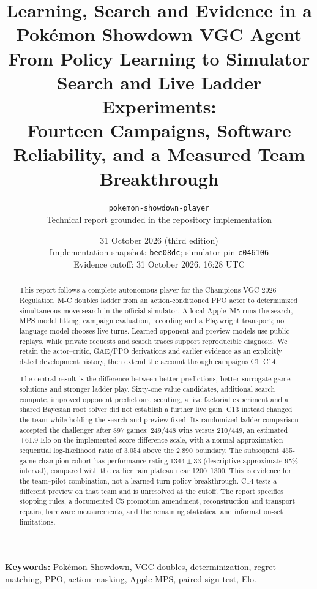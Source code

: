 \documentclass[11pt,letterpaper]{article}
\title{\textcolor{ink}{Learning, Search and Evidence in a\\
  Pok\'{e}mon Showdown VGC Agent}\\[0.6em]
  \large From Policy Learning to Simulator Search and Live Ladder Experiments:\\
  Fourteen Campaigns, Software Reliability, and a Measured Team Breakthrough}
\author{\texttt{pokemon-showdown-player}\\\small Technical report grounded in the repository implementation}
\date{31 October 2026 (third edition)\\
  \small Implementation snapshot: \texttt{bee08dc}; simulator pin \texttt{c046106}\\
  Evidence cutoff: 31 October 2026, 16:28 UTC}
\theoremstyle{remark}
\begin{document}
\maketitle
\begin{abstract}
This report follows a complete autonomous player for the Champions VGC 2026
Regulation~M-C doubles ladder from an action-conditioned PPO actor to
determinized simultaneous-move search in the official simulator. A local
Apple~M5 runs the search, MPS model fitting, campaign evaluation, recording and
a Playwright transport; no language model chooses live turns. Learned
opponent and preview models use public replays, while private requests and
search traces support reproducible diagnosis. We retain the actor--critic,
GAE/PPO derivations and earlier evidence as an explicitly dated development
history, then extend the account through campaigns C1--C14.

The central result is the difference between better predictions, better
surrogate-game solutions and stronger ladder play. Sixty-one value candidates,
additional search compute, improved opponent predictions, scouting, a live
factorial experiment and a shared Bayesian root solver did not establish a
further live gain. C13 instead changed the team while holding the search and
preview fixed. Its randomized ladder comparison accepted the challenger after
897 games: 249/448 wins versus 210/449, an estimated +61.9 Elo on the
implemented score-difference scale, with a normal-approximation sequential
log-likelihood ratio of 3.054 above the 2.890 boundary. The subsequent
455-game champion cohort has performance rating $1344\pm33$ (descriptive
approximate 95\% interval), compared with the earlier rain plateau near
1200--1300. This is evidence for the team--pilot combination, not a learned
turn-policy breakthrough. C14 tests a different preview on that team and is
unresolved at the cutoff. The report specifies stopping rules, a documented
C5 promotion amendment, reconstruction and transport repairs, hardware
measurements, and the remaining statistical and information-set limitations.
\end{abstract}

\vspace{0.5em}
\noindent\textbf{Keywords:} Pok\'{e}mon Showdown, VGC doubles, determinization,
regret matching, PPO, action masking, Apple MPS, paired sign test, Elo.

\clearpage
\setcounter{tocdepth}{1}
\tableofcontents
\listoffigures
\clearpage




















\appendix


\begingroup
\small\raggedright


\endgroup
\end{document}
